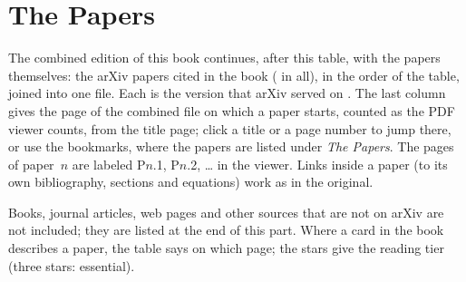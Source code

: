 \part{The Papers}\label{part:papers}
\label{ch:papers}

The combined edition of this book continues, after this table, with the papers themselves: the arXiv papers
cited in the book (\npapers{} in all), in the order of the table, joined into one file. Each is the version that arXiv served on
. The last column gives the page of the combined file on which a paper starts, counted as
the PDF viewer counts, from the title page; click a title or a page number to jump there, or use the bookmarks,
where the papers are listed under \emph{The Papers}. The pages of paper~$n$ are labeled P$n$.1, P$n$.2, \dots{} in
the viewer. Links inside a paper (to its own bibliography, sections and equations) work as in the original.

Books, journal articles, web pages and other sources that are not on arXiv are not included; they are listed at the
end of this part. Where a card in the book describes a paper, the table says on which page; the stars give the
reading tier (three stars: essential).

\medskip

